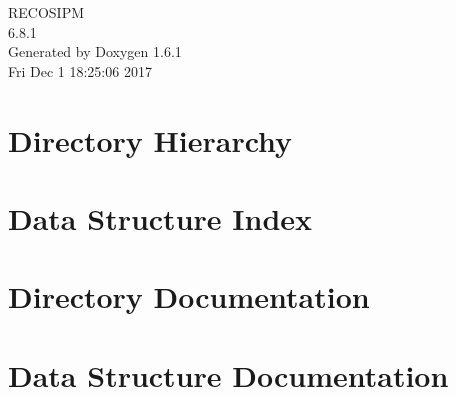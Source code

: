 \documentclass[a4paper]{book}
\begin{document}
\begin{titlepage}
\vspace*{7cm}
\begin{center}
{\Large RECOSIPM \\[1ex]\large 6.8.1 }\\
\vspace*{1cm}
{\large Generated by Doxygen 1.6.1}\\
\vspace*{0.5cm}
{\small Fri Dec 1 18:25:06 2017}\\
\end{center}
\end{titlepage}
\clearemptydoublepage
{}
\tableofcontents
\clearemptydoublepage
{}
\chapter{Directory Hierarchy}

\chapter{Data Structure Index}

\chapter{Directory Documentation}




\chapter{Data Structure Documentation}






\printindex
\end{document}
